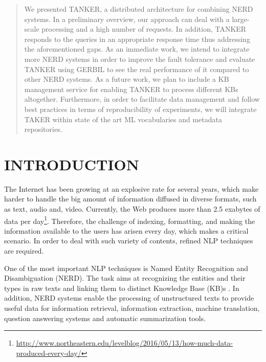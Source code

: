 \documentclass{sig-alternate}
\begin{document}

\begin{abstract}
We presented TANKER, a distributed architecture for combining NERD systems. In a preliminary overview, our approach can deal with a large-scale processing and a high number of requests. In addition, TANKER responds to the queries in an appropriate response time thus addressing the aforementioned gaps. As an immediate work, we intend to integrate more NERD systems in order to improve the fault tolerance and evaluate TANKER using GERBIL \cite{_Ref490775154} to see the real performance of it compared to other NERD systems. As a future work, we plan to include a KB management service for enabling TANKER to process different KBs altogether. Furthermore, in order to facilitate data management and follow best practices in terms of reproducibility of experiments, we will integrate TAKER within state of the art ML vocabularies and metadata repositories.
\end{abstract}



\section{INTRODUCTION}

The Internet has been growing at an explosive rate for several years, which make harder to handle the big amount of information diffused in diverse formats, such as text, audio and, video. Currently, the Web produces more than 2.5 exabytes of data per day\footnote{\url{http://www.northeastern.edu/levelblog/2016/05/13/how-much-data-produced-every-day/}}. Therefore, the challenge of indexing, formatting, and making the information available to the users has arisen every day, which makes a critical scenario. In order to deal with such variety of contents, refined NLP techniques are required.

One of the most important NLP techniques is Named Entity Recognition and Disambiguation (NERD). The task aims at recognizing the entities and their types in raw texts and linking them to distinct Knowledge Base (KB)s \cite{_Ref490759706}. In addition, NERD systems enable the processing of unstructured texts to provide useful data for information retrieval, information extraction, machine translation, question answering systems and automatic summarization tools.
\end{document}
